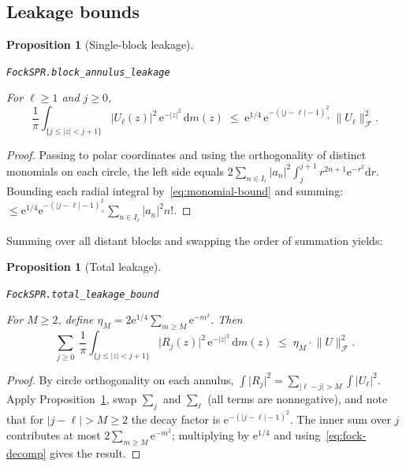 \documentclass[11pt]{amsart}
\newtheorem{proposition}[theorem]{Proposition}
\theoremstyle{definition}
\theoremstyle{remark}
\begin{document}
\subsection{Leakage bounds}

\begin{proposition}[Single-block leakage]\label{prop:single-leak}
\par\noindent\texttt{FockSPR.block\_annulus\_leakage}\par\smallskip
For $\ell \ge 1$ and $j \ge 0$,
\[
\frac{1}{\pi}\int_{\{j \le \lvert z \rvert < j+1\}}
\lvert U_\ell(z) \rvert^2\, \mathrm{e}^{-\lvert z \rvert^2}\,\mathrm{d} m(z)
\;\le\;
\mathrm{e}^{1/4}\,
\mathrm{e}^{-(\lvert j-\ell \rvert-1)_+^2}\,
\lVert U_\ell \rVert_\mathcal{F}^2.
\]
\end{proposition}

\begin{proof}
Passing to polar coordinates and using the orthogonality of distinct
monomials on each circle, the left side equals
$2\sum_{n \in I_\ell}\lvert a_n \rvert^2 \int_j^{j+1} r^{2n+1}\mathrm{e}^{-r^2}\mathrm{d} r$.
Bounding each radial integral by~\eqref{eq:monomial-bound} and summing:
$\le \mathrm{e}^{1/4}\mathrm{e}^{-(\lvert j-\ell \rvert-1)_+^2}\sum_{n \in I_\ell}\lvert a_n \rvert^2 n!$.
\end{proof}

Summing over all distant blocks and swapping the order of summation
yields:

\begin{proposition}[Total leakage]\label{prop:total-leak}
\par\noindent\texttt{FockSPR.total\_leakage\_bound}\par\smallskip
For $M \ge 2$, define $\eta_M = 2\mathrm{e}^{1/4}\sum_{m \ge M}\mathrm{e}^{-m^2}$.  Then
\[
\sum_{j \ge 0}\;
\frac{1}{\pi}\int_{\{j \le \lvert z \rvert < j+1\}}
\lvert R_j(z) \rvert^2\, \mathrm{e}^{-\lvert z \rvert^2}\,\mathrm{d} m(z)
\;\le\;
\eta_M \cdot \lVert U \rVert_\mathcal{F}^2.
\]
\end{proposition}

\begin{proof}
By circle orthogonality on each annulus,
$\int \lvert R_j \rvert^2 = \sum_{\lvert \ell-j \rvert>M}\int\lvert U_\ell \rvert^2$.
Apply Proposition~\ref{prop:single-leak}, swap $\sum_j$ and $\sum_\ell$
(all terms are nonneg\-ative), and note that for $\lvert j-\ell \rvert > M \ge 2$
the decay factor is $\mathrm{e}^{-(\lvert j-\ell \rvert-1)^2}$.  The inner sum over
$j$ contributes at most $2\sum_{m \ge M}\mathrm{e}^{-m^2}$; multiplying by
$\mathrm{e}^{1/4}$ and using~\eqref{eq:fock-decomp} gives the result.
\end{proof}
\end{document}
